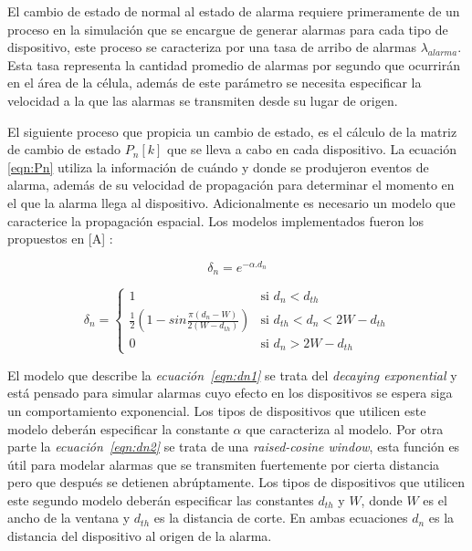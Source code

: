 El cambio de estado de normal  al estado de alarma requiere primeramente de un proceso en la simulación que se encargue de generar alarmas para cada tipo de dispositivo, este proceso se caracteriza por una tasa de arribo de alarmas $ \lambda_{alarma}$. Esta tasa representa la cantidad promedio de alarmas por segundo que ocurrirán en el área de la célula, además de este parámetro se necesita especificar la velocidad a la que las alarmas se transmiten desde su lugar de origen.\newline

El siguiente proceso que propicia un cambio de estado, es el cálculo de la matriz de cambio de estado $P_n\left[k\right]$ que se lleva a cabo en cada dispositivo. La ecuación \ref{eqn:Pn} utiliza la información de cuándo y donde se produjeron eventos de alarma, además de su velocidad de propagación para determinar el momento en el que la alarma llega al dispositivo. Adicionalmente es necesario un modelo que caracterice la propagación espacial. Los modelos implementados fueron los propuestos en [A] :\newline

\begin{equation}
\delta_n = e^{-\alpha.d_{n}}
\label{eqn:dn1}
\end{equation}

\begin{equation}
    \delta_n =
    \begin{cases}
        1  & \text{si $d_n < d_{th}$} \\
        \frac{1}{2}(1-sin\frac{\pi(d_n-W)}{2(W-d_{th})}) & \text{si $d_{th}< d_n < 2W-d_{th}$}\\
        0  & \text{si $d_n > 2W-d_{th}$}
    \end{cases}
    \label{eqn:dn2}
\end{equation}

El modelo que describe la \textit{ecuación~\ref{eqn:dn1}} se trata del \textit{decaying exponential} y está pensado para simular alarmas cuyo efecto en los dispositivos se espera siga un comportamiento exponencial. Los tipos de dispositivos que utilicen este modelo deberán especificar la constante $\alpha$ que caracteriza al modelo. Por otra parte la \textit{ecuación~\ref{eqn:dn2}} se trata de una \textit{raised-cosine window}, esta función es útil para modelar alarmas que se transmiten fuertemente por cierta distancia pero que después se detienen abrúptamente. Los tipos de dispositivos que utilicen este segundo modelo deberán especificar las constantes $d_{th}$ y $W$, donde $W$ es el ancho de la ventana y $d_{th}$ es la distancia de corte. En ambas ecuaciones $d_n$ es la distancia del dispositivo al origen de la alarma.\newline


